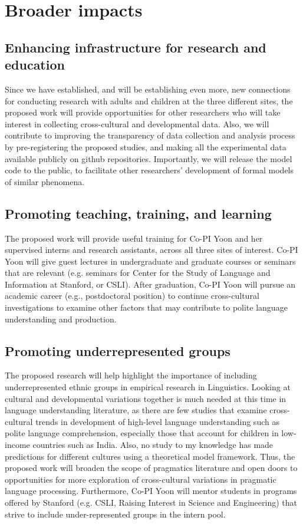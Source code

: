 \section{Broader impacts}

\subsection{Enhancing infrastructure for research and education}
Since we have established, and will be establishing even more, new connections for conducting research with adults and children at the three different sites, the proposed work will provide opportunities for other researchers who will take interest in collecting cross-cultural and developmental data.  Also, we will contribute to improving the transparency of data collection and analysis process by pre-registering the proposed studies, and making all the experimental data available publicly on github repositories. Importantly, we will release the model code to the public, to facilitate other researchers' development of formal models of similar phenomena. 

\subsection{Promoting teaching, training, and learning}
The proposed work will provide useful training for Co-PI Yoon and her supervised interns and research assistants, across all three sites of interest. Co-PI Yoon will give guest lectures in undergraduate and graduate courses or seminars that are relevant (e.g. seminars for Center for the Study of Language and Information at Stanford, or CSLI). After graduation, Co-PI Yoon will pursue an academic career (e.g., postdoctoral position) to continue cross-cultural investigations to examine other factors that may contribute to polite language understanding and production. 

\subsection{Promoting underrepresented groups}
The proposed research will help highlight the importance of including underrepresented ethnic groups in empirical research in Linguistics. Looking at cultural and developmental variations together is much needed at this time in language understanding literature, as there are few studies that examine cross-cultural trends in development of high-level language understanding such as polite language comprehension, especially those that account for children in low-income countries such as India. Also, no study to my knowledge has made predictions for different cultures using a theoretical model framework. Thus, the proposed work will broaden the scope of pragmatics literature and open doors to opportunities for more exploration of cross-cultural variations in pragmatic language processing. Furthermore, Co-PI Yoon will mentor students in programs offered by Stanford (e.g. CSLI, Raising Interest in Science and Engineering) that strive to include under-represented groups in the intern pool.
 
